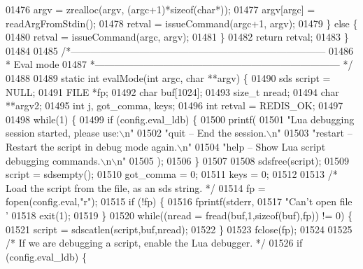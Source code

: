 \begin{DoxyCode}
{{{{{{{{{{{{{{{{{{{{{{{{{{{{{{{{{{{{{{01476         argv = zrealloc(argv, (argc+1)*\textcolor{keyword}{sizeof}(\textcolor{keywordtype}{char}*));
01477         argv[argc] = readArgFromStdin();
01478         retval = issueCommand(argc+1, argv);
01479     \} \textcolor{keywordflow}{else} \{
01480         retval = issueCommand(argc, argv);
01481     \}
01482     \textcolor{keywordflow}{return} retval;
01483 \}
01484 
01485 \textcolor{comment}{/*------------------------------------------------------------------------------}
01486 \textcolor{comment}{ * Eval mode}
01487 \textcolor{comment}{ *--------------------------------------------------------------------------- */}
01488 
01489 \textcolor{keyword}{static} \textcolor{keywordtype}{int} evalMode(\textcolor{keywordtype}{int} argc, \textcolor{keywordtype}{char} **argv) \{
01490     sds script = NULL;
01491     FILE *fp;
01492     \textcolor{keywordtype}{char} buf[1024];
01493     size\_t nread;
01494     \textcolor{keywordtype}{char} **argv2;
01495     \textcolor{keywordtype}{int} j, got\_comma, keys;
01496     \textcolor{keywordtype}{int} retval = REDIS\_OK;
01497 
01498     \textcolor{keywordflow}{while}(1) \{
01499         \textcolor{keywordflow}{if} (config.eval\_ldb) \{
01500             printf(
01501             \textcolor{stringliteral}{"Lua debugging session started, please use:\(\backslash\)n"}
01502             \textcolor{stringliteral}{"quit    -- End the session.\(\backslash\)n"}
01503             \textcolor{stringliteral}{"restart -- Restart the script in debug mode again.\(\backslash\)n"}
01504             \textcolor{stringliteral}{"help    -- Show Lua script debugging commands.\(\backslash\)n\(\backslash\)n"}
01505             );
01506         \}
01507 
01508         sdsfree(script);
01509         script = sdsempty();
01510         got\_comma = 0;
01511         keys = 0;
01512 
01513         \textcolor{comment}{/* Load the script from the file, as an sds string. */}
01514         fp = fopen(config.eval,\textcolor{stringliteral}{"r"});
01515         \textcolor{keywordflow}{if} (!fp) \{
01516             fprintf(stderr,
01517                 \textcolor{stringliteral}{"Can't open file '%
01518             exit(1);
01519         \}
01520         \textcolor{keywordflow}{while}((nread = fread(buf,1,\textcolor{keyword}{sizeof}(buf),fp)) != 0) \{
01521             script = sdscatlen(script,buf,nread);
01522         \}
01523         fclose(fp);
01524 
01525         \textcolor{comment}{/* If we are debugging a script, enable the Lua debugger. */}
01526         \textcolor{keywordflow}{if} (config.eval\_ldb) \{
}}}}}}}}}}}}}}}}}}}}}}}}}}}}}}}}}}}}}}}
\end{DoxyCode}
